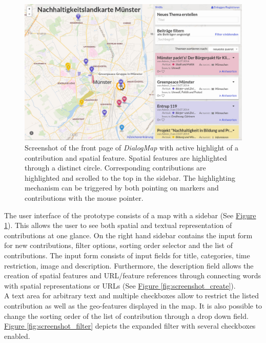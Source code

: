 \begin{figure}[!h]
    \centering
    \includegraphics[width=1\columnwidth]{images/screenshot}
    \caption{Screenshot of the front page of \textit{DialogMap} with active highlight of a contribution and spatial feature. Spatial features are highlighted through a distinct circle. Corresponding contributions are highlighted and scrolled to the top in the sidebar. The highlighting mechanism can be triggered by both pointing on markers and contributions with the mouse pointer.}
    \label{fig:screenshot}
\end{figure}

The user interface of the prototype consists of a map with a sidebar (See \hyperref[fig:screenshot]{Figure \ref{fig:screenshot}}). This allows the user to see both spatial and textual representation of contributions at one glance. On the right hand sidebar contains the input form for new contributions, filter options, sorting order selector and the list of contributions. The input form consists of input fields for title, categories, time restriction, image and description. Furthermore, the description field allows the creation of spatial features and URL/feature references through connecting words with spatial representations or URLs (See \hyperref[fig:screenshot_create]{Figure \ref{fig:screenshot_create}}).\\
A text area for arbitrary text and multiple checkboxes allow to restrict the listed contribution as well as the geo-features displayed in the map. It is also possible to change the sorting order of the list of contribution through a drop down field. \hyperref[fig:screenshot_filter]{Figure \ref{fig:screenshot_filter}} depicts the expanded filter with several checkboxes enabled.

